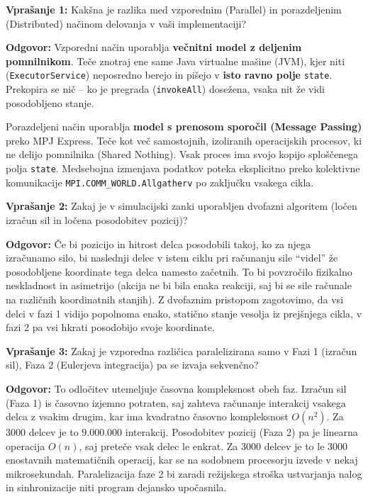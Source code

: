 \documentclass[11pt,a4paper]{article}
\begin{document}
\begin{vprasanje}
\textbf{Vprašanje 1:} Kakšna je razlika med vzporednim (Parallel) in porazdeljenim (Distributed) načinom delovanja v vaši implementaciji?

\textbf{Odgovor:} 
Vzporedni način uporablja \textbf{večnitni model z deljenim pomnilnikom}. Teče znotraj ene same Java virtualne ma\v{s}ine (JVM), kjer niti (\texttt{ExecutorService}) neposredno berejo in pi\v{s}ejo v \textbf{isto ravno polje} \texttt{state}. Prekopira se ni\v{c} -- ko je pregrada (\texttt{invokeAll}) dose\v{z}ena, vsaka nit \v{z}e vidi posodobljeno stanje.

Porazdeljeni način uporablja \textbf{model s prenosom sporo\v{c}il (Message Passing)} preko MPJ Express. Teče kot več samostojnih, izoliranih operacijskih procesov, ki ne delijo pomnilnika (Shared Nothing). Vsak proces ima svojo kopijo splo\v{s}\v{c}enega polja \texttt{state}. Medsebojna izmenjava podatkov poteka eksplicitno preko kolektivne komunikacije \texttt{MPI.COMM\_WORLD.Allgatherv} po zaključku vsakega cikla.
\end{vprasanje}

\begin{vprasanje}
\textbf{Vprašanje 2:} Zakaj je v simulacijski zanki uporabljen dvofazni algoritem (ločen izračun sil in ločena posodobitev pozicij)?

\textbf{Odgovor:}
\v{C}e bi pozicijo in hitrost delca posodobili takoj, ko za njega izračunamo silo, bi naslednji delec v istem ciklu pri računanju sile ``videl'' že posodobljene koordinate tega delca namesto začetnih. To bi povzročilo fizikalno neskladnost in asimetrijo (akcija ne bi bila enaka reakciji, saj bi se sile računale na različnih koordinatnih stanjih). 
Z dvofaznim pristopom zagotovimo, da vsi delci v fazi 1 vidijo popolnoma enako, statično stanje vesolja iz prejšnjega cikla, v fazi 2 pa vsi hkrati posodobijo svoje koordinate.
\end{vprasanje}

\begin{vprasanje}
\textbf{Vprašanje 3:} Zakaj je vzporedna različica paralelizirana samo v Fazi 1 (izračun sil), Faza 2 (Eulerjeva integracija) pa se izvaja sekvenčno?

\textbf{Odgovor:}
To odločitev utemeljuje časovna kompleksnost obeh faz. Izračun sil (Faza 1) is časovno izjemno potraten, saj zahteva računanje interakcij vsakega delca z vsakim drugim, kar ima kvadratno časovno kompleksnost $O(n^2)$. Za $3000$ delcev je to $9.000.000$ interakcij.
Posodobitev pozicij (Faza 2) pa je linearna operacija $O(n)$, saj preteče vsak delec le enkrat. Za $3000$ delcev je to le $3000$ enostavnih matematičnih operacij, kar se na sodobnem procesorju izvede v nekaj mikrosekundah. Paralelizacija faze 2 bi zaradi režijskega stroška ustvarjanja nalog in sinhronizacije niti program dejansko upo\v{c}asnila.
\end{vprasanje}
\end{document}
